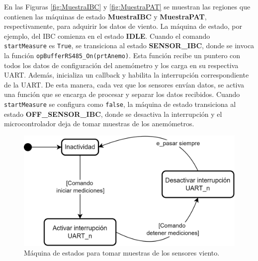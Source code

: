 En las Figuras \ref{fig:MuestraIBC} y \ref{fig:MuestraPAT} se muestran las regiones que contienen las máquinas de estado \textbf{MuestraIBC} y \textbf{MuestraPAT}, respectivamente, para adquirir los datos de viento. La máquina de estado, por ejemplo, del IBC comienza en el estado \textbf{IDLE}. Cuando el comando \texttt{startMeasure} es \texttt{True}, se transiciona al estado \textbf{SENSOR\_IBC}, donde se invoca la función \texttt{opBufferRS485\_On(prtAnemo)}. Esta función recibe un puntero con todos los datos de configuración del anemómetro y los carga en su respectiva UART. Además, inicializa un callback y habilita la interrupción correspondiente de la UART. De esta manera, cada vez que los sensores envían datos, se activa una función que se encarga de procesar y separar los datos recibidos. Cuando \texttt{startMeasure} se configura como \texttt{false}, la máquina de estado transiciona al estado \textbf{OFF\_SENSOR\_IBC}, donde se desactiva la interrupción y el microcontrolador deja de tomar muestras de los anemómetros.


\begin{figure}[H]
    \centering
    \includegraphics[width=0.6\linewidth]{Figuras/datalogger/Firmware/sc_sampleSensorWind.png}
    \caption{Máquina de estados para tomar muestras de los sensores viento.}
    \label{fig:sc_sampleSensorWind}
\end{figure}

